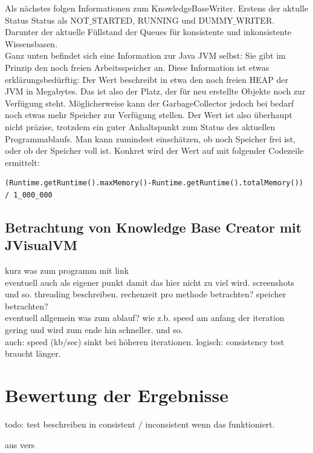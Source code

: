 \documentclass[12pt,a4paper]{article}
\begin{document}
Als nächstes folgen Informationen zum KnowledgeBaseWriter. Erstens der aktulle Status Status als NOT$\_$STARTED, RUNNING und DUMMY$\_$WRITER. Darunter der aktuelle Füllstand der Queues für konsistente und inkonsistente Wissensbasen. \\
Ganz unten befindet sich eine Information zur Java JVM selbst: Sie gibt im Prinzip den noch freien Arbeitsspeicher an. Diese Information ist etwas erklärungsbedürftig: Der Wert beschreibt in etwa den noch freien HEAP der JVM in Megabytes. Das ist also der Platz, der für neu erstellte Objekte noch zur Verfügung steht. Möglicherweise kann der GarbageCollector jedoch bei bedarf noch etwas mehr Speicher zur Verfügung stellen. Der Wert ist also überhaupt nicht präzise, trotzdem ein guter Anhaltspunkt zum Status des aktuellen Programmablaufs. Man kann zumindest einschätzen, ob noch Speicher frei ist, oder ob der Speicher voll ist. Konkret wird der Wert auf mit folgender Codezeile ermittelt:


\begin{lstlisting}
(Runtime.getRuntime().maxMemory()-Runtime.getRuntime().totalMemory()) / 1_000_000
\end{lstlisting}


\subsection{Betrachtung von Knowledge Base Creator mit JVisualVM}
kurz was zum programm mit link \\
eventuell auch als eigener punkt damit das hier nicht zu viel wird. screenshots und so. threading beschreiben. rechenzeit pro methode betrachten? speicher betrachten? \\
eventuell allgemein was zum ablauf? wie z.b. speed am anfang der iteration gering und wird zum ende hin schneller. und so. \\
auch: speed (kb/sec) sinkt bei höheren iterationen. logisch: consistency test braucht länger.

\section{Bewertung der Ergebnisse}
todo: test beschreiben in consistent / inconsistent wenn das funktioniert.

aus vers

\newpage

 
\end{document}
